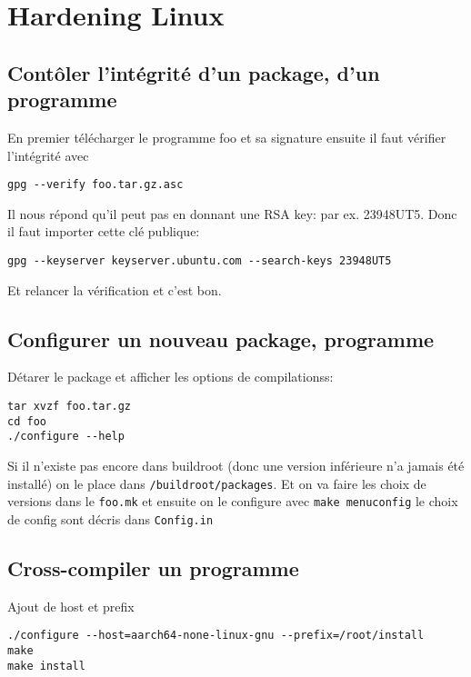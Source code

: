 \section{Hardening Linux}
\subsection{Contôler l'intégrité d'un package, d'un programme}
En premier télécharger le programme foo et sa signature ensuite il faut vérifier l'intégrité avec
\begin{lstlisting}[style=bash]
gpg --verify foo.tar.gz.asc
\end{lstlisting}
Il nous répond qu'il peut pas en donnant une RSA key: par ex. 23948UT5. Donc il faut importer cette clé publique:
\begin{lstlisting}[style=bash]
gpg --keyserver keyserver.ubuntu.com --search-keys 23948UT5
\end{lstlisting}
Et relancer la vérification et c'est bon.
\subsection{Configurer un nouveau package, programme}
Détarer le package et afficher les options de compilationss:
\begin{lstlisting}[style=bash]
tar xvzf foo.tar.gz
cd foo
./configure --help
\end{lstlisting}
Si il n'existe pas encore dans buildroot (donc une version inférieure n'a jamais été installé) on le place dans \verb!/buildroot/packages!.
Et on va faire les choix de versions dans le \verb!foo.mk! et ensuite on le configure avec \verb!make menuconfig! le choix de config sont décris dans \verb!Config.in!

\subsection{Cross-compiler un programme}
Ajout de host et prefix
\begin{lstlisting}[style=console]
./configure --host=aarch64-none-linux-gnu --prefix=/root/install
make 
make install
\end{lstlisting}

